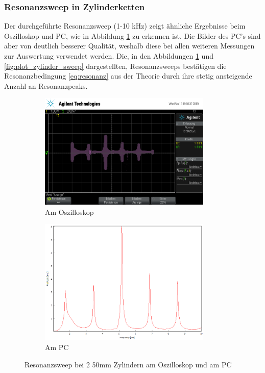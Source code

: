 \subsubsection{Resonanzsweep in Zylinderketten}
Der durchgeführte Resonanzsweep (1-10 kHz) zeigt ähnliche Ergebnisse beim Oszilloskop und PC, wie in Abbildung \ref{fig:plot_2zylinder_sweep} zu erkennen ist.
Die Bilder des PC's sind aber von deutlich besserer Qualität, weshalb diese bei allen weiteren Messungen zur Auswertung verwendet werden.
Die, in den Abbildungen \ref{fig:plot_2zylinder_sweep} und \ref{fig:plot_zylinder_sweep} dargestellten, Resonanzsweeps bestätigen die Resonanzbedingung \eqref{eq:resonanz} aus der Theorie durch ihre stetig ansteigende Anzahl an Resonanzpeaks.
\begin{figure}
  \centering
  \begin{subfigure}{0.48\textwidth}
    \centering
    \includegraphics[width=0.9\textwidth]{Bilder/Oszillator_Zylindermessung/scope_0.png}
    \caption{Am Oszilloskop}
  \end{subfigure}
  \begin{subfigure}{0.48\textwidth}
    \centering
    \includegraphics[width=0.9\textwidth]{Bilder/PC_Zylindermessung/2_Zylinder.png}
    \caption{Am PC}
  \end{subfigure}
  \caption{Resonanzsweep bei 2 50mm Zylindern am Oszilloskop und am PC}
  \label{fig:plot_2zylinder_sweep}
\end{figure}

